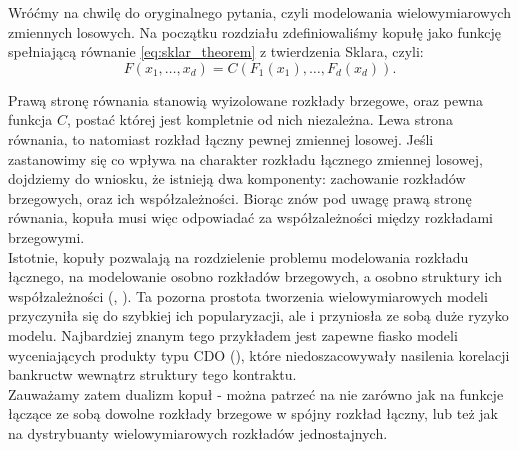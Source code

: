 Wróćmy na chwilę do oryginalnego pytania, czyli modelowania wielowymiarowych zmiennych losowych. Na początku rozdziału zdefiniowaliśmy kopułę jako funkcję spełniającą równanie \ref{eq:sklar_theorem} z twierdzenia Sklara, czyli:
$$F(x_1, \dots, x_d) = C(F_1(x_1), \dots, F_d(x_d)).$$

Prawą stronę równania stanowią wyizolowane rozkłady brzegowe, oraz pewna funkcja $C$, postać której jest kompletnie od nich niezależna. Lewa strona równania, to natomiast rozkład łączny pewnej zmiennej losowej. Jeśli zastanowimy się co wpływa na charakter rozkładu łącznego zmiennej losowej, dojdziemy do wniosku, że istnieją dwa komponenty: zachowanie rozkładów brzegowych, oraz ich współzależności. Biorąc znów pod uwagę prawą stronę równania, kopuła musi więc odpowiadać za współzależności między rozkładami brzegowymi. \\
Istotnie, kopuły pozwalają na rozdzielenie problemu modelowania rozkładu łącznego, na modelowanie osobno rozkładów brzegowych, a osobno struktury ich współzależności (\cite{Sklar_Theorem}, \cite{Joe_Multivariate_Models}). Ta pozorna prostota tworzenia wielowymiarowych modeli przyczyniła się do szybkiej ich popularyzacji, ale i przyniosła ze sobą duże ryzyko modelu. Najbardziej znanym tego przykładem jest zapewne fiasko modeli wyceniających produkty typu CDO (\cite{CDS_Copula}), które niedoszacowywały nasilenia korelacji bankructw wewnątrz struktury tego kontraktu.\\

Zauważamy zatem dualizm kopuł - można patrzeć na nie zarówno jak na funkcje łączące ze sobą dowolne rozkłady brzegowe w spójny rozkład łączny, lub też jak na dystrybuanty wielowymiarowych rozkładów jednostajnych.\\